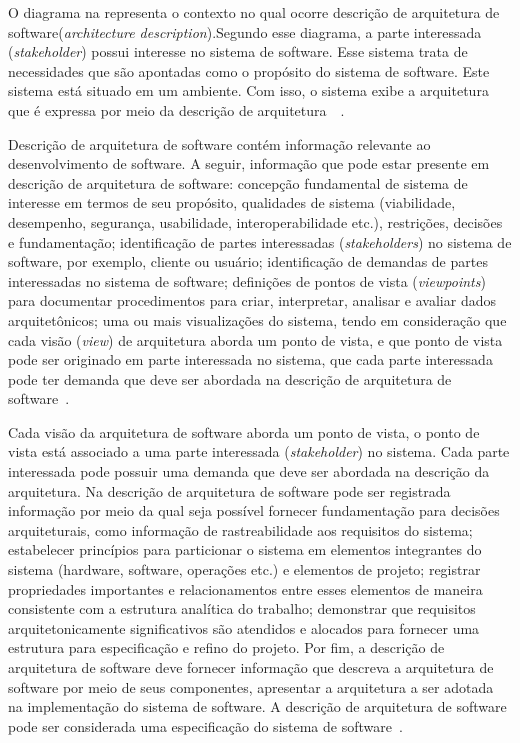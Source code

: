 %

O diagrama na  representa o contexto no qual ocorre descrição de arquitetura de software(\emph{architecture description}).Segundo esse diagrama, a parte interessada (\emph{stakeholder}) possui interesse no sistema de software. Esse sistema trata de necessidades que são apontadas como o propósito do sistema de software. Este sistema está situado em um ambiente. Com isso, o sistema exibe a arquitetura que é expressa por meio da descrição de arquitetura~\cite{ISO_1471}~\cite{ISO_42010}. 

Descrição de arquitetura de software contém informação relevante ao desenvolvimento de software. A seguir, informação que pode estar presente em descrição de arquitetura de software: concepção fundamental de sistema de interesse em termos de seu propósito, qualidades de sistema (viabilidade, desempenho, segurança, usabilidade, interoperabilidade etc.), restrições, decisões e fundamentação; identificação de partes interessadas (\emph{stakeholders}) no sistema de software, por exemplo, cliente ou usuário; identificação de demandas de partes interessadas no sistema de software; definições de pontos de vista (\emph{viewpoints}) para documentar procedimentos para criar, interpretar, analisar e avaliar dados arquitetônicos; uma ou mais visualizações do sistema, tendo em consideração que cada visão (\emph{view}) de arquitetura aborda um ponto de vista, e que ponto de vista pode ser originado em parte interessada no sistema, que cada parte interessada pode ter demanda que deve ser abordada na descrição de arquitetura de software~\cite{ISO_15289}. 

Cada visão da arquitetura de software aborda um ponto de vista, o ponto de vista está associado a uma parte interessada (\emph{stakeholder}) no sistema. Cada parte interessada pode possuir uma demanda que deve ser abordada na descrição da arquitetura. Na descrição de arquitetura de software pode ser registrada informação por meio da qual seja possível fornecer fundamentação para decisões arquiteturais, como informação de rastreabilidade aos requisitos do sistema; estabelecer princípios para particionar o sistema em elementos integrantes do sistema (hardware, software, operações etc.) e elementos de projeto; registrar propriedades importantes e relacionamentos entre esses elementos de maneira consistente com a estrutura analítica do trabalho; demonstrar que requisitos arquitetonicamente significativos são atendidos e alocados para fornecer uma estrutura para especificação e refino do projeto. Por fim, a descrição de arquitetura de software deve fornecer informação que descreva a arquitetura de software por meio de seus componentes, apresentar a arquitetura a ser adotada na implementação do sistema de software. A descrição de arquitetura de software pode ser considerada uma especificação do sistema de software~\cite{ISO_15289}. 

